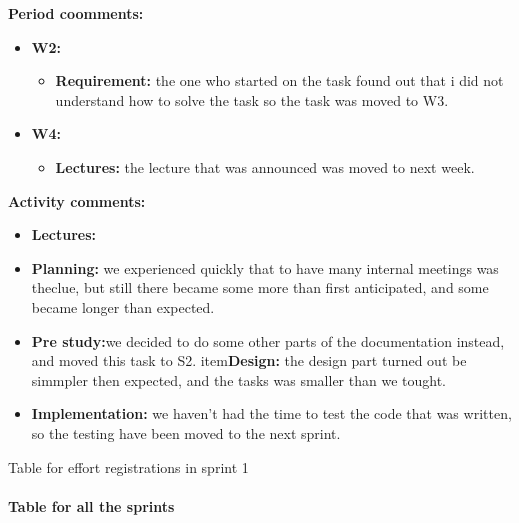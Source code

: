\begin{table}
\textbf{Period coomments:}
\begin{itemize}
\item{}\textbf{W2:} 
\begin{itemize}
\item{}\textbf{Requirement:} the one who started on the task found out that i did not understand how to solve the task so the task was moved to W3. 
\end{itemize}
\item{}\textbf{W4:}
\begin{itemize}
\item{} \textbf{Lectures:} the lecture that was announced was moved to next week. 
\end{itemize}
\end{itemize}


\textbf{Activity comments:}
\begin{itemize}
\item{} \textbf{Lectures:} 
\item{}\textbf{Planning:} we experienced quickly that to have many internal meetings was theclue, but still there became some more than first anticipated, and some became longer than expected. 
\item{}\textbf{Pre study:}we decided to do some other parts of the documentation instead, and moved this task to S2. item{}\textbf{Design:} the design part turned out be simmpler then expected, and the tasks was smaller than we tought. \item{}\textbf{Implementation:} we haven't had the time to test the code that was written, so the testing have been moved to the next sprint.
\end{itemize}
\caption{Table for effort registrations in sprint 1} \label{tab:effortweekss1}
\end{table}



\paragraph{Table for all the sprints}\hfill

